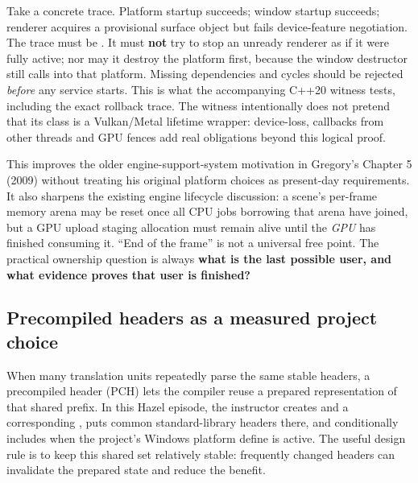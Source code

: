 Take a concrete trace. Platform startup succeeds; window startup succeeds; renderer acquires a provisional surface object but fails device-feature negotiation. The trace must be . It must \textbf{not} try to stop an unready renderer as if it were fully active; nor may it destroy the platform first, because the window destructor still calls into that platform. Missing dependencies and cycles should be rejected \emph{before} any service starts. This is what the accompanying C++20 witness tests, including the exact rollback trace. The witness intentionally does not pretend that its  class is a Vulkan/Metal lifetime wrapper: device-loss, callbacks from other threads and GPU fences add real obligations beyond this logical proof.

This improves the older engine-support-system motivation in Gregory's Chapter 5 (2009) without treating his original platform choices as present-day requirements. It also sharpens the existing engine lifecycle discussion: a scene's per-frame memory arena may be reset once all CPU jobs borrowing that arena have joined, but a GPU upload staging allocation must remain alive until the \emph{GPU} has finished consuming it. ``End of the frame'' is not a universal free point. The practical ownership question is always \textbf{what is the last possible user, and what evidence proves that user is finished?}

\subsection{Precompiled headers as a measured project choice}\label{05-engine-i-ch013-precompiled-headers-as-a-measured-project-choice}

\hypertarget{05-engine-i-ch013-precompiled-headers-as-a-measured-project-choice}{}

When many translation units repeatedly parse the same stable headers, a precompiled header (PCH) lets the compiler reuse a prepared representation of that shared prefix. In this Hazel episode, the instructor creates  and a corresponding , puts common standard-library headers there, and conditionally includes  when the project's Windows platform define is active. The useful design rule is to keep this shared set relatively stable: frequently changed headers can invalidate the prepared state and reduce the benefit.


